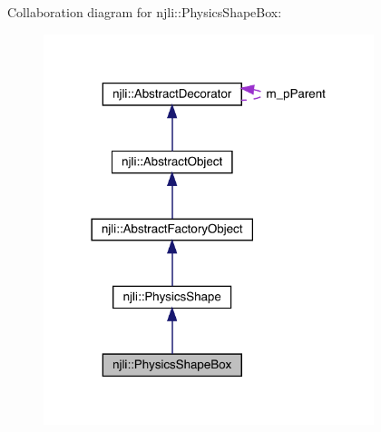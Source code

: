 Collaboration diagram for njli\+:\+:Physics\+Shape\+Box\+:\nopagebreak
\begin{figure}[H]
\begin{center}
\leavevmode
\includegraphics[width=273pt]{classnjli_1_1_physics_shape_box__coll__graph}
\end{center}
\end{figure}
